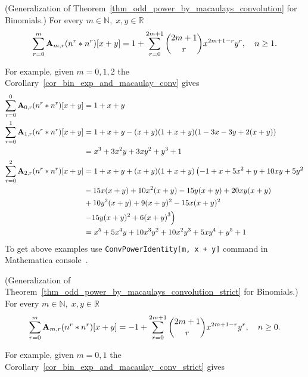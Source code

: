 \begin{cor}
    \label{cor_bin_exp_and_macaulay_conv}
    (Generalization of Theorem~\ref{thm_odd_power_by_macaulays_convolution} for Binomials.)
    For every $m\in\mathbb{N}, \; x,y\in\mathbb{R}$
    \begin{equation*}
        \sum_{r=0}^{m} {\mathbf{A}} \sb{m,r} (n \sp{r} \ast n \sp{r}) [x+y]
        =
        1 + \sum_{r=0}^{2m+1} \binom{2m+1}{r} x^{2m+1-r} y^r, \quad n\geq 1.
    \end{equation*}
\end{cor}
For example, given $m=0,1,2$ the Corollary~\ref{cor_bin_exp_and_macaulay_conv} gives
\begin{equation*}
    \begin{split}
        \sum_{r=0}^{0} {\mathbf{A}} \sb{0,r} (n \sp{r} \ast n \sp{r}) [x+y]
        &= 1 + x + y \\
        \sum_{r=0}^{1} {\mathbf{A}} \sb{1,r} (n \sp{r} \ast n \sp{r}) [x+y]
        &= 1 + x + y - (x + y) (1 + x + y) (1 - 3 x - 3 y + 2 (x + y)) \\
        &= x^3 + 3 x^2 y + 3 x y^2 + y^3 + 1\\
        \sum_{r=0}^{2} {\mathbf{A}} \sb{2,r} (n \sp{r} \ast n \sp{r}) [x+y]
        &=1 + x + y + (x + y) (1 + x + y) \left(-1 + x + 5 x^2 + y + 10 x y + 5 y^2\right. \\
        &-15 x (x + y) + 10 x^2 (x + y) - 15 y (x + y) + 20 x y (x + y) \\
        &+ 10 y^2 (x + y) +9 (x + y)^2 - 15 x (x + y)^2 \\
        &\left.-15 y (x + y)^{2} + 6 {(x + y)}^{3}\right) \\
        &=x^5 + 5 x^4 y + 10 x^3 y^2 + 10 x^2 y^3 + 5 x y^4 + y^5 + 1
    \end{split}
\end{equation*}
To get above examples use \texttt{ConvPowerIdentity[m, x + y]} command in Mathematica console~\cite{mmca_package}.
\begin{cor}
    \label{cor_bin_exp_and_macaulay_conv_strict}
    (Generalization of Theorem~\ref{thm_odd_power_by_macaulays_convolution_strict} for Binomials.)
    For every $m\in\mathbb{N}, \; x,y\in\mathbb{R}$
    \begin{equation*}
        \sum_{r=0}^{m} {\mathbf{A}} \sb{m,r} (n \sp{r} \ast n \sp{r}) [x+y]
        =
        -1 + \sum_{r=0}^{2m+1} \binom{2m+1}{r} x^{2m+1-r} y^r, \quad n\geq 0.
    \end{equation*}
\end{cor}
For example, given $m=0,1$ the Corollary~\ref{cor_bin_exp_and_macaulay_conv_strict} gives
